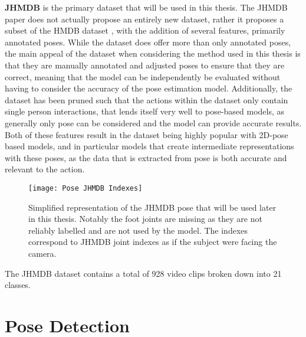 \textbf{JHMDB} \cite{JHMDB} is the primary dataset that will be used in this thesis. The JHMDB paper does not actually propose an entirely new dataset, rather it proposes a subset of the HMDB dataset \cite{hmdb}, with the addition of several features, primarily annotated poses. While the dataset does offer more than only annotated poses, the main appeal of the dataset when considering the method used in this thesis is that they are manually  annotated and adjusted poses to ensure that they are correct, meaning that the model can be independently be evaluated without having to consider the accuracy of the pose estimation model. Additionally, the dataset has been pruned such that the actions within the dataset only contain single person interactions, that lends itself very well to pose-based models, as generally only pose can be considered and the model can provide accurate results. Both of these features result in the dataset being highly popular with 2D-pose based models, and in particular models that create intermediate representations with these poses, as the data that is extracted from pose is both accurate and relevant to the action.

\begin{figure}[ht]
	\texttt{[image: Pose JHMDB Indexes]}
	\centering
	\caption{Simplified representation of the JHMDB pose that will be used later in this thesis. Notably the foot joints are missing as they are not reliably labelled and are not used by the model. The indexes correspond to JHMDB joint indexes as if the subject were facing the camera.}
	\label{fig:JHMDB}
\end{figure}

The JHMDB dataset contains a total of 928 video clips broken down into 21 classes.

\section{Pose Detection}
\label{sec:pose-detection}


